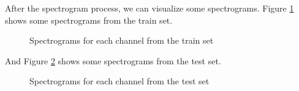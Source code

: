 After the spectrogram process, we can visualize some spectrograms. Figure \ref{fig:spectrogram} shows some spectrograms from the train set.

\begin{figure}[H]
    \centering
    \qquad
    \caption{Spectrograms for each channel from the train set}
    \label{fig:spectrogram}
\end{figure}

And Figure \ref{fig:spectrogram_test} shows some spectrograms from the test set.

\begin{figure}[H]
    \centering
    \qquad
    \caption{Spectrograms for each channel from the test set}
    \label{fig:spectrogram_test}
\end{figure}


